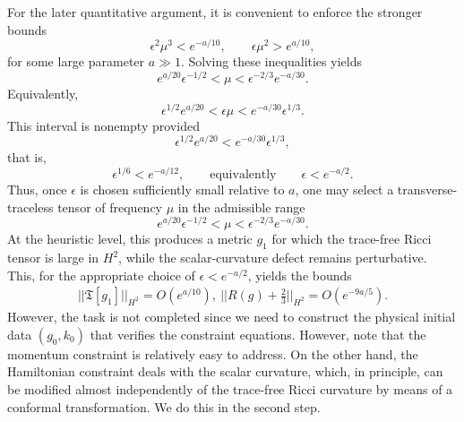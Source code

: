 \documentclass{amsart}
\begin{document}
\noindent For the later quantitative argument, it is convenient to enforce the stronger bounds
\[
\epsilon^{2}\mu^{3}<e^{-a/10},
\qquad
\epsilon\mu^{2}>e^{a/10},
\]
for some large parameter $a\gg1$. Solving these inequalities yields
\[
e^{a/20}\epsilon^{-1/2}<\mu<\epsilon^{-2/3}e^{-a/30}.
\]
Equivalently,
\[
\epsilon^{1/2}e^{a/20}<\epsilon\mu<e^{-a/30}\epsilon^{1/3}.
\]
This interval is nonempty provided
\[
\epsilon^{1/2}e^{a/20}<e^{-a/30}\epsilon^{1/3},
\]
that is,
\[
\epsilon^{1/6}<e^{-a/12},
\qquad\text{equivalently}\qquad
\epsilon<e^{-a/2}.
\]
Thus, once $\epsilon$ is chosen sufficiently small relative to $a$, one may select a transverse-traceless tensor of frequency $\mu$ in the admissible range
\begin{equation}\label{eq:accum_intro}
e^{a/20}\epsilon^{-1/2}<\mu<\epsilon^{-2/3}e^{-a/30}.
\end{equation}
At the heuristic level, this produces a metric $g_{1}$ for which the trace-free Ricci tensor is large in $H^{2}$, while the scalar-curvature defect remains perturbative. This, for the appropriate choice of $\epsilon<e^{-a/2}$, yields the bounds 
\begin{align*}
 ||\mathfrak{T}[g_{1}]||_{H^{2}}=O(e^{a/10}),~||R(g)+\frac{2}{3}||_{H^{2}}=O(e^{-9a/5}).   
\end{align*}
However, the task is not completed since we need to construct the physical initial data $(g_{0},k_{0})$ that verifies the constraint equations. However, note that the momentum constraint is relatively easy to address. On the other hand, the Hamiltonian constraint deals with the scalar curvature, which, in principle, can be modified almost independently of the trace-free Ricci curvature by means of a conformal transformation. We do this in the second step.  
\end{document}
